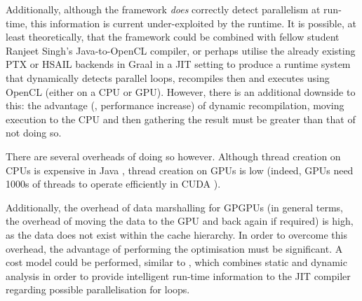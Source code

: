 Additionally, although the framework \emph{does} correctly detect parallelism at run-time, this information is current under-exploited by the runtime. It is possible, at least theoretically, that the framework could be combined with fellow student Ranjeet Singh's Java-to-OpenCL compiler, or perhaps utilise the already existing PTX or HSAIL backends in Graal in a JIT setting to produce a runtime system that dynamically detects parallel loops, recompiles then and executes using OpenCL (either on a CPU or GPU). However, there is an additional downside to this: the advantage (\ie, performance increase) of dynamic recompilation, moving execution to the CPU and then gathering the result must be greater than that of not doing so.

There are several overheads of doing so however. Although thread creation on CPUs is expensive in Java \citep{JSR133}, thread creation on GPUs is low \citep{Mueller2009} (indeed, GPUs need 1000s of threads to operate efficiently in CUDA \citep{Nvidia2011}).

Additionally, the overhead of data marshalling for GPGPUs (in general terms, the overhead of moving the data to the GPU and back again if required) is high, as the data does not exist within the cache hierarchy. In order to overcome this overhead, the advantage of performing the optimisation must be significant. A cost model could be performed, similar to \citet{Tournavitis2009}, which combines static and dynamic analysis in order to provide intelligent run-time information to the JIT compiler regarding possible parallelisation for loops.